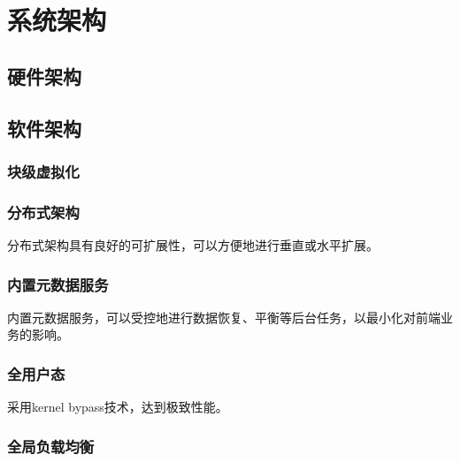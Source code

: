 \chapter{系统架构}

\section{硬件架构}

\section{软件架构}



\subsection{块级虚拟化}

\subsection{分布式架构}

分布式架构具有良好的可扩展性，可以方便地进行垂直或水平扩展。

\subsection{内置元数据服务}

内置元数据服务，可以受控地进行数据恢复、平衡等后台任务，以最小化对前端业务的影响。

\subsection{全用户态}

采用kernel bypass技术，达到极致性能。

\subsection{全局负载均衡}


